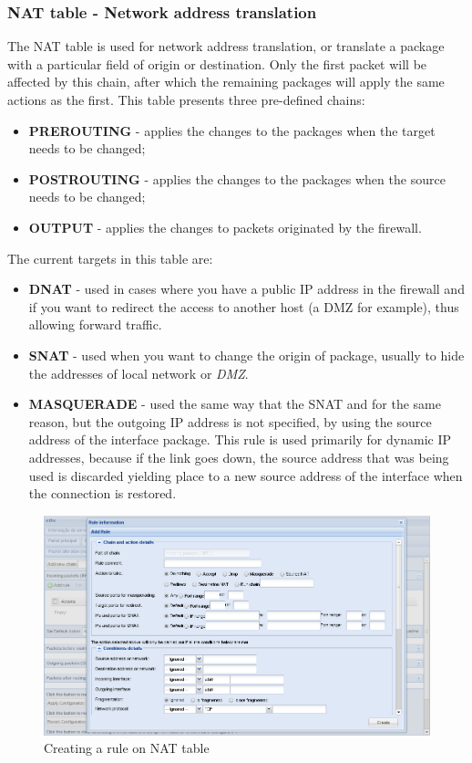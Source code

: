 \subsubsection{NAT table - Network address translation}
The NAT table is used for network address translation, or translate a package with a particular field of origin or destination.
Only the first packet will be affected by this chain, after which the remaining packages will apply the same actions as the first.
This table presents three pre-defined chains:

\begin{itemize}
    \item \textbf{PREROUTING} - applies the changes to the packages when the target needs to be changed;
    \item \textbf{POSTROUTING} - applies the changes to the packages when the source needs to be changed;
    \item \textbf{OUTPUT} - applies the changes to packets originated by the firewall.
\end{itemize}

The current targets in this table are:

\begin{itemize}
    \item \textbf{DNAT} - used in cases where you have a public IP address in the firewall and if you want to redirect the access to another host (a DMZ for example), thus allowing forward traffic.
    \item \textbf{SNAT} - used when you want to change the origin of package, usually to hide the addresses of local network or \textit{DMZ}.
    \item \textbf{MASQUERADE} - used the same way that the SNAT and for the same reason, but the outgoing IP address is not specified, by using the source address of the interface package. This rule is used primarily for dynamic IP addresses, because if the link goes down, the source address that was being used is discarded yielding place to a new source address of the interface when the connection is restored.
\end{itemize}

\begin{figure}[H]
    \begin{center}
    \includegraphics[scale=0.38]{screenshots/etfw/etfw_firewall_04.png}
    \caption{Creating a rule on NAT table}
    \label{fig:etfw_firewall_03}
    \end{center}
\end{figure}

